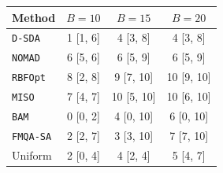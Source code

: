 \begin{tabular}{@{}lccc@{}}\toprule
Method & \(B=10\) & \(B=15\) & \(B=20\)\\\midrule
\texttt{D-SDA} & 1 [1, 6] & 4 [3, 8] & 4 [3, 8] \\
\texttt{NOMAD} & 6 [5, 6] & 6 [5, 9] & 6 [5, 9] \\
\texttt{RBFOpt} & 8 [2, 8] & 9 [7, 10] & 10 [9, 10] \\
\texttt{MISO} & 7 [4, 7] & 10 [5, 10] & 10 [6, 10] \\
\texttt{BAM} & 0 [0, 2] & 4 [0, 10] & 6 [0, 10] \\
\texttt{FMQA-SA} & 2 [2, 7] & 3 [3, 10] & 7 [7, 10] \\
Uniform & 2 [0, 4] & 4 [2, 4] & 5 [4, 7] \\
\bottomrule\end{tabular}

